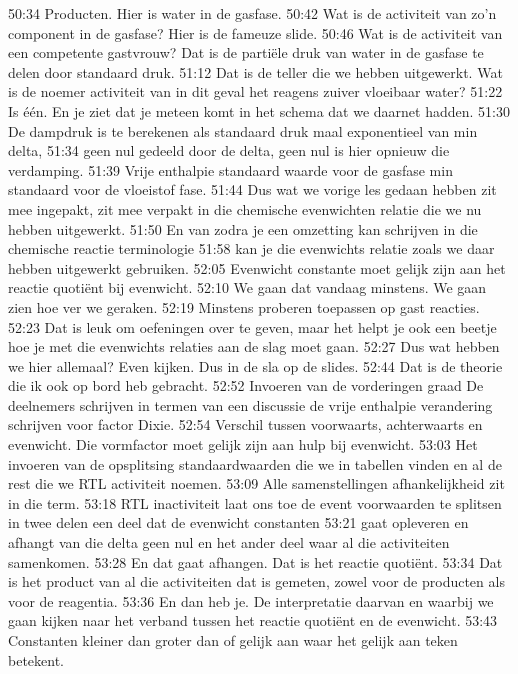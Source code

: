 50:34
Producten. Hier is water in de gasfase.
50:42
Wat is de activiteit van zo'n component in de gasfase? Hier is de fameuze slide.
50:46
Wat is de activiteit van een competente gastvrouw? Dat is de partiële druk van water in de gasfase te delen door standaard druk.
51:12
Dat is de teller die we hebben uitgewerkt. Wat is de noemer activiteit van in dit geval het reagens zuiver vloeibaar water?
51:22
Is één. En je ziet dat je meteen komt in het schema dat we daarnet hadden.
51:30
De dampdruk is te berekenen als standaard druk maal exponentieel van min delta,
51:34
geen nul gedeeld door de delta, geen nul is hier opnieuw die verdamping.
51:39
Vrije enthalpie standaard waarde voor de gasfase min standaard voor de vloeistof fase.
51:44
Dus wat we vorige les gedaan hebben zit mee ingepakt, zit mee verpakt in die chemische evenwichten relatie die we nu hebben uitgewerkt.
51:50
En van zodra je een omzetting kan schrijven in die chemische reactie terminologie
51:58
kan je die evenwichts relatie zoals we daar hebben uitgewerkt gebruiken.
52:05
Evenwicht constante moet gelijk zijn aan het reactie quotiënt bij evenwicht.
52:10
We gaan dat vandaag minstens. We gaan zien hoe ver we geraken.
52:19
Minstens proberen toepassen op gast reacties.
52:23
Dat is leuk om oefeningen over te geven, maar het helpt je ook een beetje hoe je met die evenwichts relaties aan de slag moet gaan.
52:27
Dus wat hebben we hier allemaal? Even kijken. Dus in de sla op de slides.
52:44
Dat is de theorie die ik ook op bord heb gebracht.
52:52
Invoeren van de vorderingen graad De deelnemers schrijven in termen van een discussie de vrije enthalpie verandering schrijven voor factor Dixie.
52:54
Verschil tussen voorwaarts, achterwaarts en evenwicht. Die vormfactor moet gelijk zijn aan hulp bij evenwicht.
53:03
Het invoeren van de opsplitsing standaardwaarden die we in tabellen vinden en al de rest die we RTL activiteit noemen.
53:09
Alle samenstellingen afhankelijkheid zit in die term.
53:18
RTL inactiviteit laat ons toe de event voorwaarden te splitsen in twee delen een deel dat de evenwicht constanten
53:21
gaat opleveren en afhangt van die delta geen nul en het ander deel waar al die activiteiten samenkomen.
53:28
En dat gaat afhangen. Dat is het reactie quotiënt.
53:34
Dat is het product van al die activiteiten dat is gemeten, zowel voor de producten als voor de reagentia.
53:36
En dan heb je. De interpretatie daarvan en waarbij we gaan kijken naar het verband tussen het reactie quotiënt en de evenwicht.
53:43
Constanten kleiner dan groter dan of gelijk aan waar het gelijk aan teken betekent.
